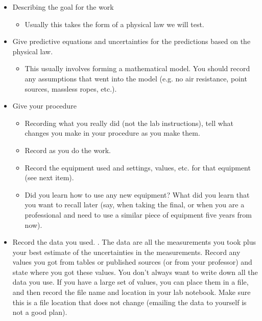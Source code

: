 \begin{itemize}
\item Describing the goal for the work

\begin{itemize}
\item Usually this takes the form of a physical law we will test.
\end{itemize}

\item Give predictive equations and uncertainties for the predictions based
on the physical law.

\begin{itemize}
\item This usually involves forming a mathematical model. You should record
any assumptions that went into the model (e.g. no air resistance, point
sources, massless ropes, etc.).
\end{itemize}

\item Give your procedure

\begin{itemize}
\item Recording what you really did (not the lab instructions), tell what
changes you make in your procedure as you make them.

\item Record as you do the work.

\item Record the equipment used and settings, values, etc. for that
equipment (see next item).

\item Did you learn how to use any new equipment? What did you learn that
you want to recall later (say, when taking the final, or when you are a
professional and need to use a similar piece of equipment five years from
now).
\end{itemize}

\item Record the data you used. . The data are all the measurements you took
plus your best estimate of the uncertainties in the measurements. Record any
values you got from tables or published sources (or from your professor) and
state where you got these values. You don't always want to write down all
the data you use. If you have a large set of values, you can place them in a
file, and then record the file name and location in your lab notebook. Make
sure this is a file location that does not change (emailing the data to
yourself is not a good plan).


\end{itemize}
